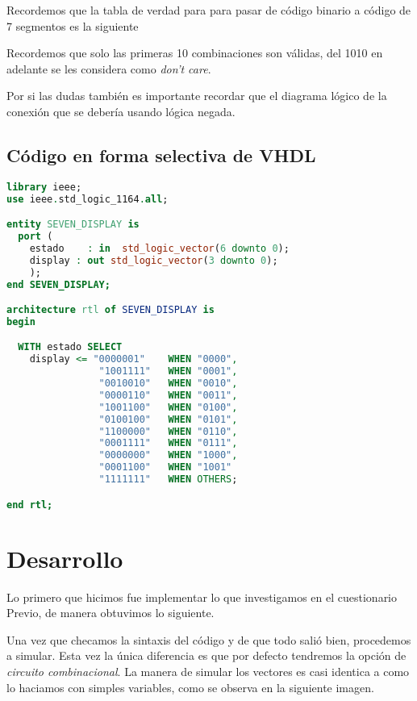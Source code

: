 \documentclass{mylib/reporteConCalif}
\begin{document}
Recordemos que la tabla de verdad para para pasar de código binario a código de 7 segmentos es la siguiente


Recordemos que solo las primeras 10 combinaciones son válidas, del 1010 en adelante se les considera como \textit{don't care}.

Por si las dudas también es importante recordar que el diagrama lógico de la conexión que se debería usando lógica negada.


\newpage
\subsection{Código en forma selectiva de VHDL}

\begin{lstlisting}[language=VHDL]
library ieee;
use ieee.std_logic_1164.all;

entity SEVEN_DISPLAY is
  port (
    estado    : in  std_logic_vector(6 downto 0);
    display : out std_logic_vector(3 downto 0);
    );
end SEVEN_DISPLAY;

architecture rtl of SEVEN_DISPLAY is
begin

  WITH estado SELECT
    display <= "0000001"    WHEN "0000",
                "1001111"   WHEN "0001",
                "0010010"   WHEN "0010",
                "0000110"   WHEN "0011",
                "1001100"   WHEN "0100",
                "0100100"   WHEN "0101",
                "1100000"   WHEN "0110",
                "0001111"   WHEN "0111",
                "0000000"   WHEN "1000",
                "0001100"   WHEN "1001"
                "1111111"   WHEN OTHERS;

end rtl;
\end{lstlisting}


\newpage
\section{Desarrollo}

Lo primero que hicimos fue implementar lo que investigamos en el cuestionario Previo, de manera obtuvimos lo siguiente.


Una vez que checamos la sintaxis del código y de que todo salió bien, procedemos a simular. Esta vez la única diferencia es que por defecto tendremos la opción de \textit{circuito combinacional}. La manera de simular los vectores es casi identica a como lo haciamos con simples variables, como se observa en la siguiente imagen.
\end{document}
